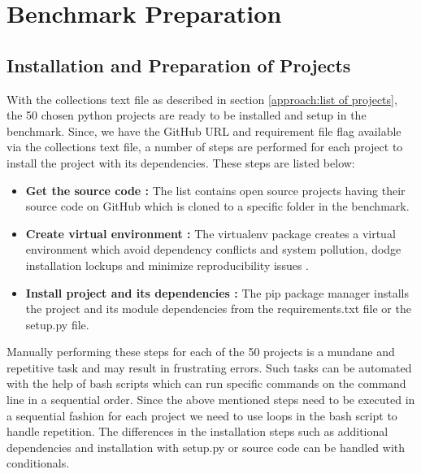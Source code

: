 \section{Benchmark Preparation}
\label{approach:benchmark preparation}

\subsection{Installation and Preparation of Projects}
\label{approach:bash scripts}
With the collections text file as described in section \ref{approach:list of projects}, the 50 chosen python projects are ready to be installed and setup in the benchmark. Since, we have the GitHub URL and requirement file flag available via the collections text file, a number of steps are performed for each project to install the project with its dependencies. These steps are listed below:
\begin{itemize}
    \item \textbf{Get the source code :} The list contains open source projects having their source code on GitHub which is cloned to a specific folder in the benchmark. 
    \item \textbf{Create virtual environment :} The virtualenv \cite{virtualenv} package creates a virtual environment which avoid dependency conflicts and system pollution, dodge installation lockups and minimize reproducibility issues \cite{Why_Virtual_Env}.
    \item \textbf{Install project and its dependencies :} The pip package manager \cite{pip_package_manager} installs the project and its module dependencies from the requirements.txt file or the setup.py file.
\end{itemize}
Manually performing these steps for each of the 50 projects is a mundane and repetitive task and may result in frustrating errors.
Such tasks can be automated with the help of bash scripts which can run specific commands on the command line in a sequential order.
Since the above mentioned steps need to be executed in a sequential fashion for each project we need to use loops in the bash script to handle repetition.
The differences in the installation steps such as additional dependencies and installation with setup.py or source code can be handled with conditionals.


